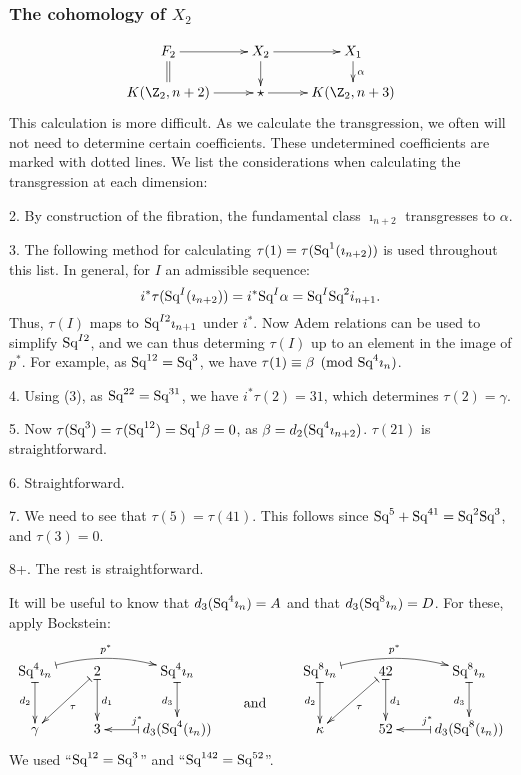 \documentclass[11pt]{article}
\begin{document}
{\subsubsection{\texorpdfstring{The cohomology of $X_2$}{The cohomology of X2}}
\[\xymatrix@R=5mm{
F_2\ar[r]\ar@{=}[d]&
X_2\ar[d]\ar[r]&
X_{1}\ar[d]^{\alpha}\\
K(\Z_2,n+2)\ar[r]&\star\ar[r]&K(\Z_2,n+3)
}\]
This calculation is more difficult. As we calculate the transgression, we often
will not need to determine certain coefficients. These undetermined coefficients
are marked with dotted lines. We list the considerations when calculating the
transgression at each dimension:
\begin{itemise}
\item[2.]By construction of the fibration, the fundamental class
$\imath_{n+2}$ transgresses to $\alpha$.
\item[3.] The following method for calculating 
$\tau(1)=\tau(\textup{Sq}^1(\imath_{n+2}))$
is used throughout this list. In general, for $I$ an admissible sequence:
\[i^*\tau(\textup{Sq}^I(\imath_{n+2}))=i^*\textup{Sq}^I\alpha=\textup{Sq}^I\textup{Sq}^2i_{n+1}.\]
Thus, $\tau(I)$ maps to $\textup{Sq}^{I2}\imath_{n+1}$ under $i^*$. Now Adem relations
can be used to simplify $\textup{Sq}^{I2}$, and we can thus determing $\tau(I)$ up to
an element in the image of $p^*$. For example, as $\textup{Sq}^{12}=\textup{Sq}^3$, we have
$\tau(1)\equiv\beta\pmod{\textup{Sq}^4\imath_n}$.
\item[4.] Using (3), as $\textup{Sq}^{22}=\textup{Sq}^{31}$, we have $i^*\tau(2)=31$,
which determines $\tau(2)=\gamma$.
\item[5.] Now $\tau(\textup{Sq}^3)=\tau(\textup{Sq}^{12})=\textup{Sq}^1\beta=0$, as 
$\beta=d_2(\textup{Sq}^4\imath_{n+2})$. $\tau(21)$ is straightforward.
\item[6.] Straightforward.
\item[7.] We need to see that $\tau(5)=\tau(41)$. This follows since
$\textup{Sq}^5+\textup{Sq}^{41}=\textup{Sq}^2\textup{Sq}^3$, and $\tau(3)=0$.
\item[8+.] The rest is straightforward.
\end{itemise}
It will be useful to know that $d_3(\textup{Sq}^4\imath_n)=A$ and that
$d_3(\textup{Sq}^8\imath_n)=D$. For these, apply Bockstein:
\[\xymatrix{
\Squ^4\imath_n\ar@{|->}[d]_{d_2}\ar@{|->}@/^.81pc/[rr]^{p^*}&
2\ar@{|->}[ld]^\tau\ar@{|->}[d]^{d_1}&
\Squ^4\imath_n\ar@{|->}[d]_{d_{3}}\\
\gamma&
3&d_3(\Squ^4(\imath_n))\ar@{|->}[l]_{j^*}
}
\raisebox{-.8cm}{\qquad and\qquad\ }
\xymatrix{
\Squ^8\imath_n\ar@{|->}[d]_{d_2}\ar@{|->}@/^.81pc/[rr]^{p^*}&
42\ar@{|->}[ld]^\tau\ar@{|->}[d]^{d_1}&
\Squ^8\imath_n\ar@{|->}[d]_{d_{3}}\\
\kappa&
52&d_3(\Squ^8(\imath_n))\ar@{|->}[l]_{j^*}
}
\]
We used ``$\textup{Sq}^{12}=\textup{Sq}^{3}$'' and
``$\textup{Sq}^{142}=\textup{Sq}^{52}$''.
}
\end{document}
